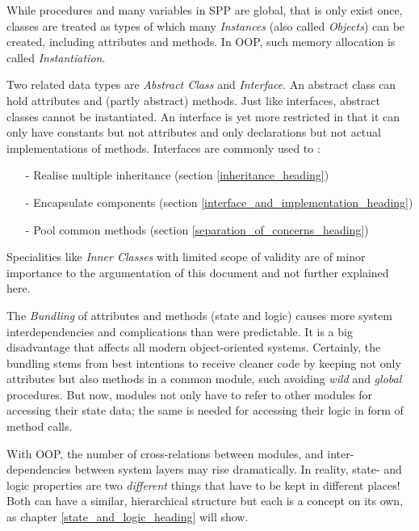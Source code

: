 While procedures and many variables in SPP are global, that is only exist once,
classes are treated as types of which many \emph{Instances} (also called
\emph{Objects}) can be created, including attributes and methods. In OOP, such
memory allocation is called \emph{Instantiation}.

Two related data types are \emph{Abstract Class} and \emph{Interface}. An
abstract class can hold attributes and (partly abstract) methods. Just like
interfaces, abstract classes cannot be instantiated. An interface is yet more
restricted in that it can only have constants but not attributes and only
declarations but not actual implementations of methods. Interfaces are commonly
used to \cite{steppan}:

\begin{itemize}
    \item[-] Realise multiple inheritance (section \ref{inheritance_heading})
    \item[-] Encapsulate components (section \ref{interface_and_implementation_heading})
    \item[-] Pool common methods (section \ref{separation_of_concerns_heading})
\end{itemize}

Specialities like \emph{Inner Classes} \cite{java} with limited scope of
validity are of minor importance to the argumentation of this document and not
further explained here.

The \emph{Bundling} of attributes and methods (state and logic) causes more
system interdependencies and complications than were predictable. It is a big
disadvantage that affects all modern object-oriented systems. \cite{heller2004}
Certainly, the bundling stems from best intentions to receive cleaner code by
keeping not only attributes but also methods in a common module, such avoiding
\emph{wild} and \emph{global} procedures. But now, modules not only have to
refer to other modules for accessing their state data; the same is needed for
accessing their logic in form of method calls.

With OOP, the number of cross-relations between modules, and inter-dependencies
between system layers may rise dramatically. In reality, state- and logic
properties are two \emph{different} things that have to be kept in different
places! Both can have a similar, hierarchical structure but each is a concept on
its own, as chapter \ref{state_and_logic_heading} will show.
